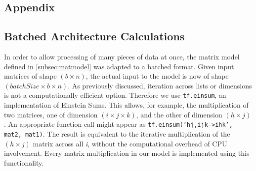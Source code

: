 \begin{appendices}
	\chapter{Appendix}
	\section{Batched Architecture Calculations}
	\label{asec:batched}
	In order to allow processing of many pieces of data at once, the matrix 
	model defined in \ref{subsec:matmodel} was adapted to a batched format.  
	Given input matrices of shape $(b \times n)$, the actual input to the model 
	is now of shape $(batchSize \times b \times n)$. As previously discussed, 
	iteration across lists or dimensions is not a computationally efficient 
	option. Therefore we use \texttt{tf.einsum}, an implementation of Einstein 
	Sums. This allows, for example, the multiplication of two matrices, one of 
	dimension $(i \times j \times k)$, and the other of dimension $(h \times 
	j)$. An appropriate function call might appear as
	\texttt{tf.einsum(`hj,ijk->ihk', mat2, mat1)}. The result is equivalent to 
	the iterative multiplication of the $(h \times j)$ matrix across all 
	\textit{i}, without the computational overhead of CPU involvement. Every 
	matrix multiplication in our model is implemented using this functionality.

\end{appendices}
